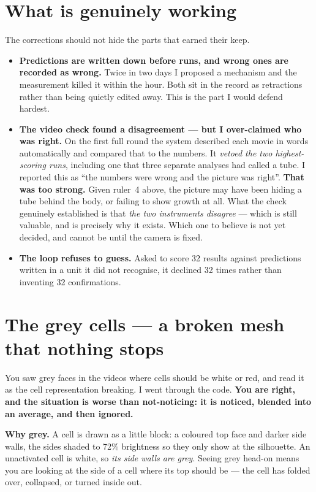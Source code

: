 \documentclass[11pt,a4paper]{article}
\begin{document}
\section{What is genuinely working}

The corrections should not hide the parts that earned their keep.

\begin{itemize}
\item \textbf{Predictions are written down before runs, and wrong ones are recorded as wrong.}
Twice in two days I proposed a mechanism and the measurement killed it within the hour. Both sit in
the record as retractions rather than being quietly edited away. This is the part I would defend
hardest.
\item \textbf{The video check found a disagreement --- but I over-claimed who was right.}
On the first full round the system described each movie in words automatically and compared that
to the numbers. It \emph{vetoed the two highest-scoring runs}, including one that three separate
analyses had called a tube. I reported this as ``the numbers were wrong and the picture was
right''. \textbf{That was too strong.} Given ruler~4 above, the picture may have been hiding a
tube behind the body, or failing to show growth at all. What the check genuinely established is
that \emph{the two instruments disagree} --- which is still valuable, and is precisely why it
exists. Which one to believe is not yet decided, and cannot be until the camera is fixed.
\item \textbf{The loop refuses to guess.} Asked to score 32 results against predictions written in
a unit it did not recognise, it declined 32 times rather than inventing 32 confirmations.
\end{itemize}

\section{The grey cells --- a broken mesh that nothing stops}\label{sec:phantom}

You saw grey faces in the videos where cells should be white or red, and read it as the cell
representation breaking. I went through the code. \textbf{You are right, and the situation is
worse than not-noticing: it is noticed, blended into an average, and then ignored.}

\textbf{Why grey.} A cell is drawn as a little block: a coloured top face and darker side walls,
the sides shaded to 72\% brightness so they only show at the silhouette. An unactivated cell is
white, so \emph{its side walls are grey}. Seeing grey head-on means you are looking at the side of
a cell where its top should be --- the cell has folded over, collapsed, or turned inside out.
\end{document}
